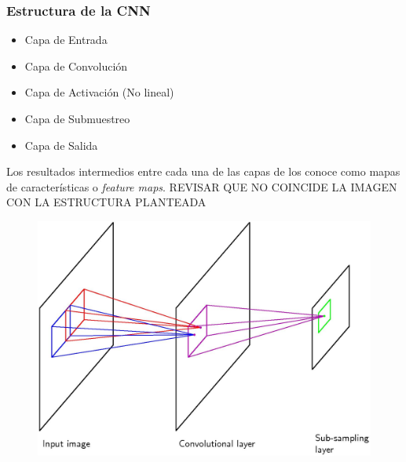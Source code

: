 \documentclass[10pt,center]{beamer}
\begin{document}
\begin{frame}
  \frametitle{Estructura de la CNN}
    \begin{itemize}
     \item Capa de Entrada
     \item Capa de Convolución
     \item Capa de Activación (No lineal)
     \item Capa de Submuestreo
     \item Capa de Salida
    \end{itemize}
  Los resultados intermedios entre cada una de las capas de los conoce como mapas de características o \textit{feature maps}.
  REVISAR QUE NO COINCIDE LA IMAGEN CON LA ESTRUCTURA PLANTEADA
  \begin{figure}[h]
    \begin{center}
    \includegraphics[height=0.5\textheight]{./img/bishop_cnn.jpg}
    \end{center}
  \end{figure}
\end{frame}
\end{document}
